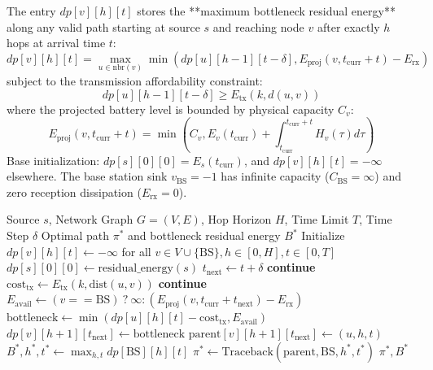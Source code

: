 \documentclass[journal]{IEEEtran}
\begin{document}
The entry $dp[v][h][t]$ stores the **maximum bottleneck residual energy** along any valid path starting at source $s$ and reaching node $v$ after exactly $h$ hops at arrival time $t$:
\begin{equation}
dp[v][h][t] = \max_{u \in \text{nbr}(v)} \min\left( dp[u][h-1][t-\delta], E_{\text{proj}}(v, t_{\text{curr}} + t) - E_{\text{rx}} \right)
\end{equation}
subject to the transmission affordability constraint:
\begin{equation}
dp[u][h-1][t-\delta] \ge E_{\text{tx}}(k, d(u, v))
\end{equation}
where the projected battery level is bounded by physical capacity $C_v$:
\begin{equation}
E_{\text{proj}}(v, t_{\text{curr}} + t) = \min\left( C_v, E_v(t_{\text{curr}}) + \int_{t_{\text{curr}}}^{t_{\text{curr}}+t} H_v(\tau) d\tau \right)
\end{equation}
Base initialization: $dp[s][0][0] = E_s(t_{\text{curr}})$, and $dp[v][h][t] = -\infty$ elsewhere. The base station sink $v_{\text{BS}} = -1$ has infinite capacity ($C_{\text{BS}} = \infty$) and zero reception dissipation ($E_{\text{rx}} = 0$).

\begin{algorithm}[!t]
\caption{3D Time-Augmented Dynamic Programming Routing}
\label{alg:time_dp}
\begin{algorithmic}[1]
\REQUIRE Source $s$, Network Graph $G = (V, E)$, Hop Horizon $H$, Time Limit $T$, Time Step $\delta$
\ENSURE Optimal path $\pi^*$ and bottleneck residual energy $B^*$
\STATE Initialize $dp[v][h][t] \leftarrow -\infty$ for all $v \in V \cup \{\text{BS}\}, h \in [0, H], t \in [0, T]$
\STATE $dp[s][0][0] \leftarrow \text{residual\_energy}(s)$
                \STATE $t_{\text{next}} \leftarrow t + \delta$
                    \STATE \textbf{continue}
                \ENDIF
                \STATE $\text{cost}_{\text{tx}} \leftarrow E_{\text{tx}}(k, \text{dist}(u, v))$
                    \STATE \textbf{continue}
                \ENDIF
                \STATE $E_{\text{avail}} \leftarrow (v == \text{BS}) \ ? \ \infty : (E_{\text{proj}}(v, t_{\text{curr}} + t_{\text{next}}) - E_{\text{rx}})$
                \STATE $\text{bottleneck} \leftarrow \min(dp[u][h][t] - \text{cost}_{\text{tx}}, E_{\text{avail}})$
                    \STATE $dp[v][h+1][t_{\text{next}}] \leftarrow \text{bottleneck}$
                    \STATE $\text{parent}[v][h+1][t_{\text{next}}] \leftarrow (u, h, t)$
                \ENDIF
            \ENDFOR
        \ENDFOR
    \ENDFOR
\ENDFOR
\STATE $B^*, h^*, t^* \leftarrow \max_{h, t} dp[\text{BS}][h][t]$
\STATE $\pi^* \leftarrow \text{Traceback}(\text{parent}, \text{BS}, h^*, t^*)$
\RETURN $\pi^*, B^*$
\end{algorithmic}
\end{algorithm}
\end{document}
